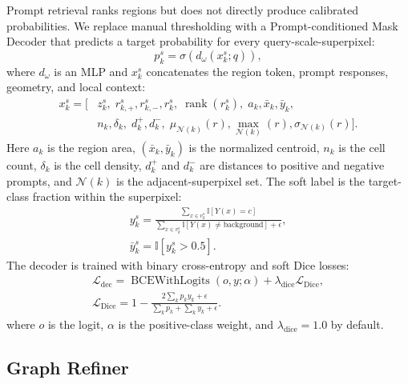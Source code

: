 \documentclass[letterpaper]{article} %
\begin{document}
Prompt retrieval ranks regions but does not directly produce calibrated probabilities. We replace manual thresholding with a Prompt-conditioned Mask Decoder that predicts a target probability for every query-scale-superpixel:
\begin{equation}
    p_k^s = \sigma\left(d_{\omega}(x_k^s;q)\right),
\end{equation}
where $d_{\omega}$ is an MLP and $x_k^s$ concatenates the region token, prompt responses, geometry, and local context:
\begin{equation}
\begin{split}
    x_k^s=[&z_k^s,\;
    r_{k,+}^{s}, r_{k,-}^{s}, r_k^s,\;
    \operatorname{rank}(r_k^s),\;
    a_k,\bar{x}_k,\bar{y}_k,\\
    &n_k,\delta_k,\;
    d_k^{+}, d_k^{-},\;
    \mu_{\mathcal{N}(k)}(r),\max_{\mathcal{N}(k)}(r),
    \sigma_{\mathcal{N}(k)}(r)] .
\end{split}
\end{equation}
Here $a_k$ is the region area, $(\bar{x}_k,\bar{y}_k)$ is the normalized centroid, $n_k$ is the cell count, $\delta_k$ is the cell density, $d_k^{+}$ and $d_k^{-}$ are distances to positive and negative prompts, and $\mathcal{N}(k)$ is the adjacent-superpixel set. The soft label is the target-class fraction within the superpixel:
\begin{equation}
\begin{aligned}
    y_k^s =
    \frac{\sum_{x\in v_k^s}\mathbb{I}[Y(x)=c]}
    {\sum_{x\in v_k^s}\mathbb{I}[Y(x)\neq \mathrm{background}] + \epsilon},\\
    \bar{y}_k^s=\mathbb{I}[y_k^s>0.5].
\end{aligned}
\end{equation}
The decoder is trained with binary cross-entropy and soft Dice losses:
\begin{equation}
\begin{aligned}
    \mathcal{L}_{\mathrm{dec}}=
    \operatorname{BCEWithLogits}(o,y;\alpha)
    +\lambda_{\mathrm{dice}}\mathcal{L}_{\mathrm{Dice}},\\
    \mathcal{L}_{\mathrm{Dice}}=
    1-\frac{2\sum_k p_k y_k+\epsilon}
    {\sum_k p_k+\sum_k y_k+\epsilon}.
\end{aligned}
\end{equation}
where $o$ is the logit, $\alpha$ is the positive-class weight, and $\lambda_{\mathrm{dice}}=1.0$ by default.

\subsection{Graph Refiner}
\end{document}
